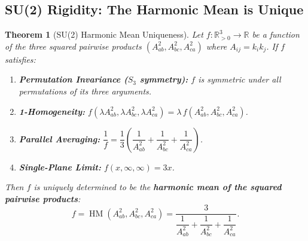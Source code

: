 \documentclass[11pt,twocolumn]{article}
\newtheorem{theorem}{Theorem}[section]
\begin{document}
\subsection{SU(2) Rigidity: The Harmonic Mean is Unique}
\label{app:su2_rigidity}

\begin{theorem}[SU(2) Harmonic Mean Uniqueness]
\label{thm:su2_rigidity}
Let $f: \mathbb{R}^3_{>0} \to \mathbb{R}$ be a function of the three squared pairwise products $(A_{ab}^2, A_{bc}^2, A_{ca}^2)$ where $A_{ij} = k_i k_j$. If $f$ satisfies:
\begin{enumerate}[label=(\roman*)]
    \item \textbf{Permutation Invariance ($S_3$ symmetry):} $f$ is symmetric under all permutations of its three arguments.
    \item \textbf{1-Homogeneity:} $f(\lambda A_{ab}^2, \lambda A_{bc}^2, \lambda A_{ca}^2) = \lambda\, f(A_{ab}^2, A_{bc}^2, A_{ca}^2)$.
    \item \textbf{Parallel Averaging:} $\dfrac{1}{f} = \dfrac{1}{3}\!\left(\dfrac{1}{A_{ab}^2} + \dfrac{1}{A_{bc}^2} + \dfrac{1}{A_{ca}^2}\right)$.
    \item \textbf{Single-Plane Limit:} $f(x, \infty, \infty) = 3x$.
\end{enumerate}
Then $f$ is uniquely determined to be the \textbf{harmonic mean of the squared pairwise products}:
\begin{equation*}
f = \operatorname{HM}(A_{ab}^2, A_{bc}^2, A_{ca}^2)
= \frac{3}{\dfrac{1}{A_{ab}^2} + \dfrac{1}{A_{bc}^2} + \dfrac{1}{A_{ca}^2}}.
\end{equation*}
\end{theorem}
\end{document}
